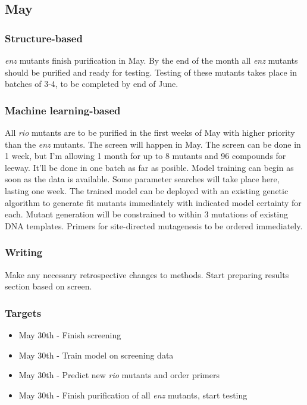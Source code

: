 \documentclass{article}
\begin{document}
\subsection{May}
\subsubsection{Structure-based}
\textit{enz} mutants finish purification in May. By the end of the month all \textit{enz} mutants should be purified and ready for testing. %
Testing of these mutants takes place in batches of 3-4, to be completed by end of June. %

\subsubsection{Machine learning-based}
All \textit{rio} mutants are to be purified in the first weeks of May with higher priority than the \textit{enz} mutants.
The screen will happen in May. The screen can be done in 1 week, but I'm allowing 1 month for up to 8 mutants and 96 compounds for leeway. It'll be done in one batch as far as posible. %
Model training can begin as soon as the data is available. Some parameter searches will take place here, lasting one week.  %
The trained model can be deployed with an existing genetic algorithm to generate fit mutants immediately with indicated model certainty for each. Mutant generation will be constrained to within 3 mutations of existing DNA templates. Primers for site-directed mutagenesis to be ordered immediately. %
\subsubsection{Writing}
Make any necessary retrospective changes to methods. Start preparing results section based on screen.
\subsubsection{Targets}
\begin{itemize}
\item May 30th - Finish screening
\item May 30th - Train model on screening data
\item May 30th - Predict new \textit{rio} mutants and order primers
\item May 30th - Finish purification of all \textit{enz} mutants, start testing
\end{itemize}
\end{document}

